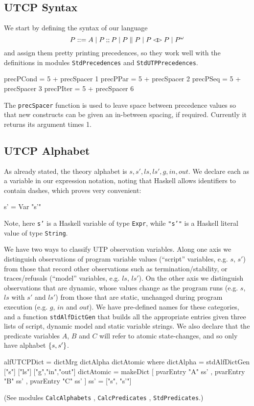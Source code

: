 
\subsection{UTCP Syntax}

We start by defining the syntax of our language
\[
   P ::= A \mid P \mathbin{\mathbf{;\!;}} P \mid P \parallel P \mid P \mathbin{\lhd\!\rhd} P \mid {P}^{\omega}
\]
and assign them pretty printing precedences,
so they work well with the definitions in modules
\texttt{StdPrecedences} and \texttt{StdUTPPrecedences}.
\begin{code}
precPCond = 5 + precSpacer  1
precPPar  = 5 + precSpacer  2
precPSeq  = 5 + precSpacer  3
precPIter = 5 + precSpacer  6
\end{code}
The \texttt{precSpacer} function is used to leave space between precedence
values so that new constructs can be given an in-between spacing,
if required. Currently it returns its argument times 1.


\subsection{UTCP Alphabet}

As already stated, the theory alphabet is $s,s',ls,ls',g,in,out$.
We declare each as a variable in our expression notation,
noting that Haskell allows identifiers to contain dashes,
which proves very convenient:
\begin{code}
s' = Var "s'"
\end{code}
Note, here \texttt{s'} is a Haskell variable of type \texttt{Expr},
while \texttt{"s'"} is a Haskell literal value of type \texttt{String}.

We have two ways to classify UTP observation variables.
Along one axis we distinguish observations of program variable
values (``script'' variables, e.g. $s$, $s'$) from those that record other
observations such as termination/stability,
or traces/refusals (``model'' variables, e.g. $ls$, $ls'$).
On the other axis we distinguish observations
that are dynamic, whose values change as the program runs
(e.g. $s$, $ls$ with $s'$ and $ls'$)
from those that are static,
unchanged during program execution (e.g. $g$, $in$ and $out$).
We have pre-defined names for these categories,
and a function \texttt{stdAlfDictGen} that
builds all the appropriate entries
given three lists of script, dynamic model and static variable strings.
We also declare that the predicate variables $A$, $B$ and $C$
will refer to atomic state-changes,
and so only have alphabet $\{{s,s'}\}$.
\begin{code}
alfUTCPDict
 = dictMrg dictAlpha dictAtomic
 where
   dictAlpha = stdAlfDictGen ["s"] ["ls"] ["g","in","out"]
   dictAtomic = makeDict [ pvarEntry "A" ss'
                         , pvarEntry "B" ss'
                         , pvarEntry "C" ss' ]
   ss' = ["s", "s'"]
\end{code}
(See modules
\texttt{CalcAlphabets}
, \texttt{CalcPredicates}
, \texttt{StdPredicates}.)
